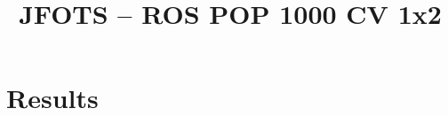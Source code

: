 \documentclass{llncs}
\title{JFOTS -- ROS POP 1000 CV 1x2}
\begin{document}
\maketitle

\section{Results}
















\end{document}
